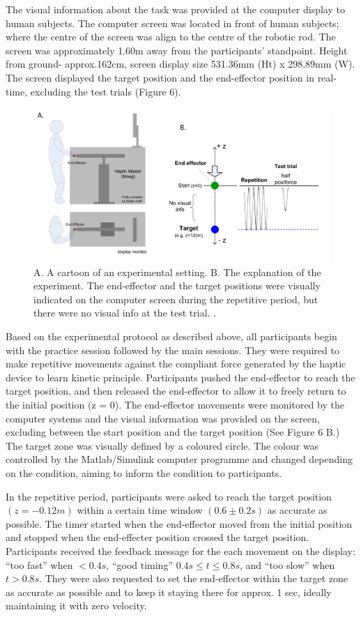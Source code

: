 The visual information about the task was provided at the computer display to human subjects.
The computer screen was located in front of human subjects; where the centre of the screen was align to the centre of the robotic rod. The screen was approximately 1.60m away from the participants’ standpoint. Height from ground- approx.162cm, screen display size 531.36mm (Ht) x 298.89mm (W). The screen displayed the target position and the end-effector position in real-time, excluding the test trials (Figure 6). 
%
\begin{figure}
	\centering
	\includegraphics[width=0.95\linewidth]{Chie/figs/Figure6.png}
	\caption{A. A cartoon of an experimental setting. B. The explanation of the experiment. The end-effector and the target positions were visually indicated on the computer screen during the repetitive period, but there were no visual info at the test trial. .}
	\label{settingHM}
\end{figure}

Based on the experimental protocol as described above, all participants begin with the practice session followed by the main sessions. They were required to make repetitive movements against the compliant force generated by the haptic device to learn kinetic principle. Participants pushed the end-effector to reach the target position, and then released the end-effector to allow it to freely return to the initial position (z = 0). The end-effector movements were monitored by the computer systems and the visual information was provided on the screen, excluding between the start position and the target position (See Figure 6 B.) The target zone was visually defined by a coloured circle. The colour was controlled by the Matlab/Simulink computer programme and changed depending on the condition, aiming to inform the condition to participants. 

In the repetitive period, participants were asked to reach the target position$ (z = -0.12 m)$ within a certain time window $(0.6\pm 0.2s)$ as accurate as possible. The timer started when the end-effector moved from the initial position and stopped when the end-effecter position crossed the target position.  Participants received the feedback message for the each movement on the display:  “too fast” when $< 0.4 s$, “good timing” $0.4s \leq t \leq 0.8 s$, and “too slow” when $t > 0.8 s$. They were also requested to set the end-effector within the target zone as accurate as possible and to keep it staying there for approx. 1 sec, ideally maintaining it with zero velocity.


